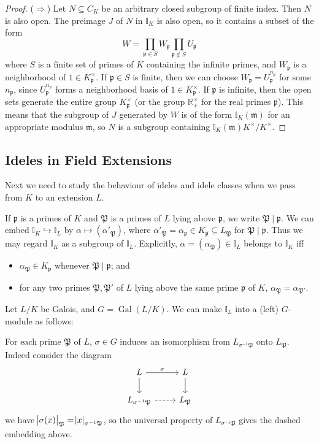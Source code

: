 \documentclass[11pt]{article}
\theoremstyle{definition}
\theoremstyle{plain}
\theoremstyle{remark}
\DeclareMathOperator{\Gal}{Gal}
\newcommand{\II}{\mathbb{I}}
\newcommand{\RR}{\mathbb{R}}
\newcommand{\cp}{\mathfrak{P}}
\newcommand{\fp}{\mathfrak{p}}
\newcommand{\fm}{\mathfrak{m}}
\begin{document}
\begin{proof}
    ($\Rightarrow$) Let $N \subseteq C_K$ be an arbitrary closed subgroup of finite index. Then $N$ is also open. The preimage $J$ of $N$ in $\II_K$ is also open, so it contains a subset of the form
    \begin{equation*}
        W = \prod_{\fp \in S} W_\fp \prod_{\fp \notin S} U_\fp
    \end{equation*}
    where $S$ is a finite set of primes of $K$ containing the infinite primes, and $W_\fp$ is a neighborhood of $1 \in K_\fp^\times$. If $\fp \in S$ is finite, then we can choose $W_\fp = U_\fp^{n_\fp}$ for some $n_\fp$, since $U_\fp^{n_\fp}$ forms a neighborhood basis of $1 \in K_\fp^\times$. If $\fp$ is infinite, then the open sets generate the entire group $K_\fp^\times$ (or the group $\RR_+^\times$ for the real primes $\fp$). This means that the subgroup of $J$ generated by $W$ is of the form $\II_K(\fm)$ for an appropriate modulus $\fm$, so $N$ is a subgroup containing $\II_K(\fm) K^\times / K^\times$. %
\end{proof}

\subsection{Ideles in Field Extensions}

Next we need to study the behaviour of ideles and idele classes when we pass from $K$ to an extension $L$.

If $\fp$ is a primes of $K$ and $\cp$ is a primes of $L$ lying above $\fp$, we write $\cp \mid \fp$. We can embed $\II_K \hookrightarrow \II_L$ by $\alpha \mapsto (\alpha'_\cp)$, where $\alpha'_\cp = \alpha_\fp \in K_\fp \subseteq L_\cp$ for $\cp \mid \fp$. Thus we may regard $\II_K$ as a subgroup of $\II_L$. Explicitly, $\alpha = (\alpha_\cp) \in \II_L$ belongs to $\II_K$ iff
\begin{itemize}
    \item $\alpha_\cp \in K_\fp$ whenever $\cp \mid \fp$; and
    \item for any two primes $\cp, \cp'$ of $L$ lying above the same prime $\fp$ of $K$, $\alpha_\cp = \alpha_{\cp'}$.
\end{itemize}

\noindent Let $L/K$ be Galois, and $G = \Gal(L/K)$. We can make $\II_L$ into a (left) $G$-module as follows:

For each prime $\cp$ of $L$, $\sigma \in G$ induces an isomorphism from $L_{\sigma^{-1}\cp}$ onto $L_\cp$. {\color{blue} Indeed consider the diagram
    \begin{equation*}
        \begin{tikzcd}
            L \arrow[r, "\sigma"] \arrow[d] & L \arrow[d]\\
            L_{\sigma^{-1} \cp} \arrow[r, dashrightarrow] & L_\cp
        \end{tikzcd}
    \end{equation*}
    we have $\abs{\sigma(x)}_\cp = \abs{x}_{\sigma^{-1}\cp}$, so the universal property of $L_{\sigma^{-1} \cp}$ gives the dashed embedding above.}
\end{document}
